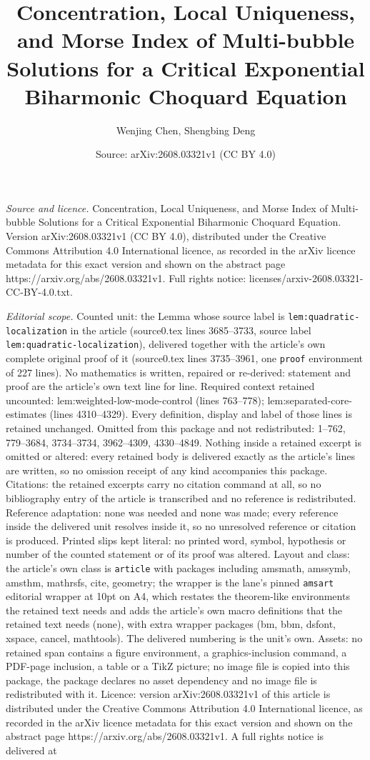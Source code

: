 \documentclass[10pt,a4paper]{amsart}
\title[Concentration, Local Uniqueness, and Morse Index of Multi-bu]{Concentration, Local Uniqueness, and Morse Index of Multi-bubble Solutions for a Critical Exponential Biharmonic Choquard Equation}
\author{Wenjing Chen, Shengbing Deng}
\date{Source: arXiv:2608.03321v1 (CC BY 4.0)}
\begin{document}
\maketitle

\noindent\emph{Source and licence.} Concentration, Local Uniqueness, and Morse Index of Multi-bubble Solutions for a Critical Exponential Biharmonic Choquard Equation. Version arXiv:2608.03321v1 (CC BY 4.0), distributed under the Creative Commons Attribution 4.0 International licence, as recorded in the arXiv licence metadata for this exact version and shown on the abstract page https://arxiv.org/abs/2608.03321v1. Full rights notice: licenses/arxiv-2608.03321-CC-BY-4.0.txt.\par\smallskip

\noindent\textit{Editorial scope.} Counted unit: the Lemma whose source label is \texttt{lem:quadratic-localization} in the article (source0.tex lines 3685--3733, source label \texttt{lem:quadratic-localization}), delivered together with the article's own complete original proof of it (source0.tex lines 3735--3961, one \texttt{proof} environment of 227 lines). No mathematics is written, repaired or re-derived: statement and proof are the article's own text line for line. Required context retained uncounted: lem:weighted-low-mode-control (lines 763--778); lem:separated-core-estimates (lines 4310--4329). Every definition, display and label of those lines is retained unchanged. Omitted from this package and not redistributed: 1--762, 779--3684, 3734--3734, 3962--4309, 4330--4849. Nothing inside a retained excerpt is omitted or altered: every retained body is delivered exactly as the article's lines are written, so no omission receipt of any kind accompanies this package. Citations: the retained excerpts carry no citation command at all, so no bibliography entry of the article is transcribed and no reference is redistributed. Reference adaptation: none was needed and none was made; every reference inside the delivered unit resolves inside it, so no unresolved reference or citation is produced. Printed slips kept literal: no printed word, symbol, hypothesis or number of the counted statement or of its proof was altered. Layout and class: the article's own class is \texttt{article} with packages including amsmath, amssymb, amsthm, mathrsfs, cite, geometry; the wrapper is the lane's pinned \texttt{amsart} editorial wrapper at 10pt on A4, which restates the theorem-like environments the retained text needs and adds the article's own macro definitions that the retained text needs (none), with extra wrapper packages (bm, bbm, dsfont, xspace, cancel, mathtools). The delivered numbering is the unit's own. Assets: no retained span contains a figure environment, a graphics-inclusion command, a PDF-page inclusion, a table or a TikZ picture; no image file is copied into this package, the package declares no asset dependency and no image file is redistributed with it. Licence: version arXiv:2608.03321v1 of this article is distributed under the Creative Commons Attribution 4.0 International licence, as recorded in the arXiv licence metadata for this exact version and shown on the abstract page https://arxiv.org/abs/2608.03321v1. A full rights notice is delivered at 
\end{document}
